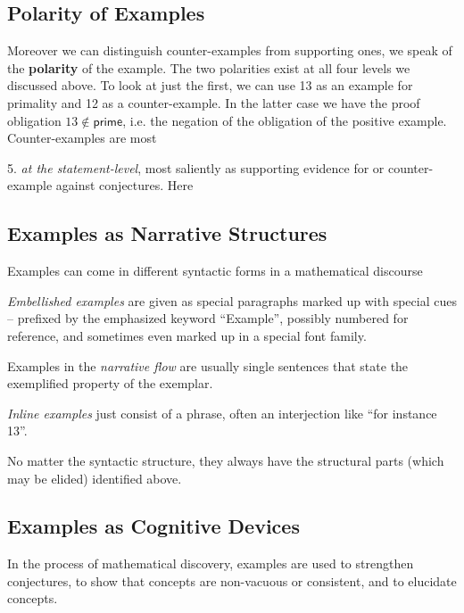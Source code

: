 \documentclass[11pt]{bluenote}
\def\cn#1{\mathsf{#1}}
\begin{document}
\subsection{Polarity of Examples}
Moreover we can distinguish counter-examples from supporting ones, we speak of the
\textbf{polarity} of the example. The two polarities exist at all four levels we discussed
above. To look at just the first, we can use 13 as an example for primality and 12 as a
counter-example. In the latter case we have the proof obligation $13\notin\cn{prime}$,
i.e. the negation of the obligation of the positive example. Counter-examples are most 
\begin{compactenum}
\item[5.] \emph{at the statement-level}, most saliently as supporting evidence for or
  counter-example against conjectures.  Here 
\end{compactenum}

\subsection{Examples as Narrative Structures}
Examples can come in different syntactic forms in a mathematical discourse
\begin{compactenum} 
\item \emph{Embellished examples} are given as
  special paragraphs marked up with special cues -- prefixed by the emphasized keyword
  ``Example'', possibly numbered for reference, and sometimes even marked up in a special
  font family.
\item Examples in the \emph{narrative flow} are usually single sentences that state the
  exemplified property of the exemplar.
\item \emph{Inline examples} just consist of a phrase, often an interjection like ``for
  instance 13''. 
\end{compactenum}
No matter the syntactic structure, they always have the structural parts (which may be
elided) identified above. 

\subsection{Examples as Cognitive Devices}
In the process of mathematical discovery, examples are used to strengthen conjectures, to
show that concepts are non-vacuous or consistent, and to elucidate concepts.
\end{document}
